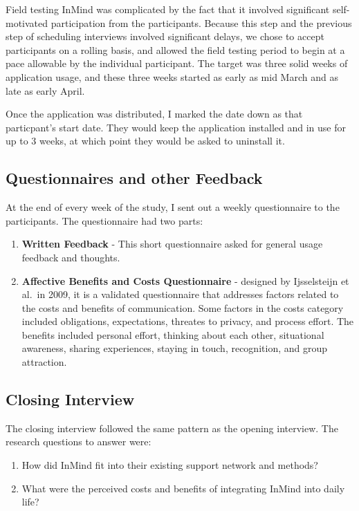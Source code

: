   Field testing InMind was complicated by the fact that it involved
  significant self-motivated participation from the participants.
  Because this step and the previous step of scheduling interviews
  involved significant delays,
  we chose to accept participants on a rolling basis,
  and allowed the field testing period to begin at a pace allowable
  by the individual participant.
  The target was three solid weeks of application usage,
  and these three weeks started as early as mid March
  and as late as early April.

  Once the application was distributed,
  I marked the date down as that particpant's start date.
  They would keep the application installed and in use for up to 3 weeks,
  at which point they would be asked to uninstall it.

  \subsection{Questionnaires and other Feedback}
  At the end of every week of the study,
  I sent out a weekly questionnaire to the participants.
  The questionnaire had two parts:
  \begin{enumerate}
  \item \textbf{Written Feedback} -
  This short questionnaire asked for
  general usage feedback and thoughts.

  \item \textbf{Affective Benefits and Costs Questionnaire} -
  designed by Ijsselsteijn et al.\ in 2009,
  it is a validated questionnaire that
  addresses factors related to the costs and benefits of communication.
  Some factors in the costs category included obligations,
  expectations, threates to privacy, and process effort.
  The benefits included personal effort,
  thinking about each other,
  situational awareness,
  sharing experiences,
  staying in touch,
  recognition,
  and group attraction.
  \end{enumerate}

  \subsection{Closing Interview}
  The closing interview followed the same pattern as the opening interview.
  The research questions to answer were:
  \begin{enumerate}
  \item How did InMind fit into their existing support network and methods?
  \item What were the perceived costs and benefits of integrating InMind
  into daily life?
  \end{enumerate}

